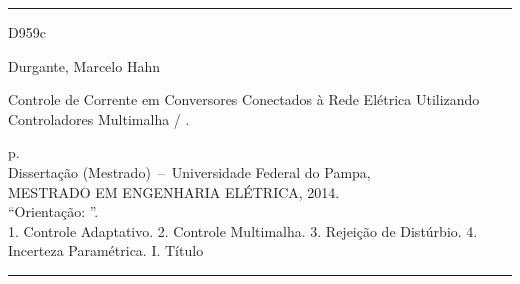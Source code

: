 
\vspace*{\fill}					%
\hrule							%
	\begin{minipage}[t]{0.1\textwidth}
		D959c
		\vspace*{\fill}%
	\end{minipage}
	\begin{minipage}[t]{0.7\textwidth}
		Durgante, Marcelo Hahn

		\hspace{0.46cm} Controle de Corrente em Conversores Conectados à Rede Elétrica Utilizando
		Controladores Multimalha / \imprimirautor.

		\hspace{0.46cm} \pageref{LastPage} p.\\

		\hspace{0.46cm} Dissertação (Mestrado)~--~Universidade Federal do Pampa,\\
		MESTRADO EM ENGENHARIA ELÉTRICA, 2014.\\

		\hspace{0.46cm} ``Orientação: \imprimirorientador''.\\

		\hspace{0.46cm}
			1. Controle Adaptativo.
			2. Controle Multimalha.
			3. Rejeição de Distúrbio.
			4. Incerteza Paramétrica.
			I. Título\\
	\end{minipage}
\hrule
